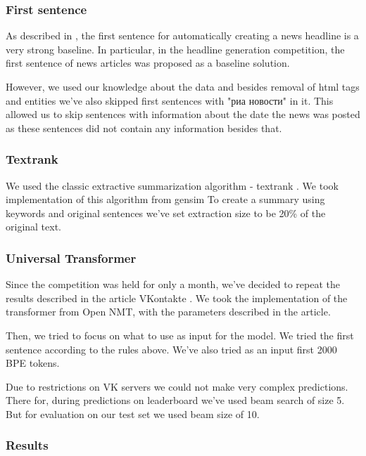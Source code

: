 \documentclass[aps,%
12pt,%
final,%
oneside,
onecolumn,%
musixtex, %
superscriptaddress,%
centertags]{article} %
\begin{document}
\subsubsection{First sentence}

As described in \cite{Putra2018IncorporatingTS}, the first sentence for automatically creating a news headline is a very strong baseline. In particular, in the headline generation competition, the first sentence of news articles was proposed as a baseline solution.

However, we used our knowledge about the data and besides removal of html tags and entities we've also skipped first sentences with "риа новости" in it. This allowed us to skip sentences with information about the date the news was posted as these sentences did not contain any information besides that.

\subsubsection{Textrank}

We used the classic extractive summarization algorithm - textrank \cite{DBLP:journals/corr/BarriosLAW16}. We took implementation of this algorithm from gensim \cite{rehurek_lrec} To create a summary using keywords and original sentences we've set extraction size to be 20\% of the original text.

\subsubsection{Universal Transformer}

Since the competition was held for only a month, we've decided to repeat the results described in the article VKontakte \cite{gavrilov2018self}. We took the implementation of the transformer from Open NMT, with the parameters described in the article.

Then, we tried to focus on what to use as input for the model. We tried the first sentence according to the rules above. We've also tried as an input first 2000 BPE tokens.

Due to restrictions on VK servers we could not make very complex predictions. There for, during predictions on leaderboard we've used beam search of size 5. But for evaluation on our test set we used beam size of 10.

\subsubsection{Results}
\end{document}

